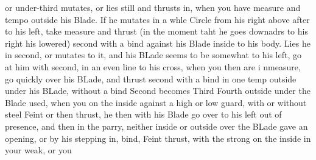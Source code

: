 \newpage


\newpage

or  under-third mutates, or lies still and thrusts in, when you have
measure and tempo outside his Blade. If he mutates in a whle Circle
from his right above after to his left, take measure and thrust (in
the moment taht he goes downadrs to his right his lowered) second with
a bind against his Blade inside to his body.
Lies he in second, or mutates to it, and his BLade seems to be
somewhat to his left, go at him with second, in an even line to his
cross, when you then are i nmeasure, go quickly over his BLade, and
thrust second with a bind in one temp outside under his BLade, without
a bind Second becomes
Third Fourth outside under the Blade used, when you on the inside
against a high or low guard, with or without steel Feint or then
thrust, he then with his Blade go over to his left out of presence,
and then in the parry, neither inside or outside over the BLade gave
an opening, or by his stepping in,
bind, Feint thrust, with the strong on the inside in your weak, or you
